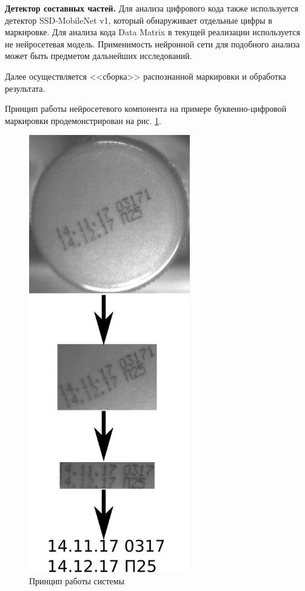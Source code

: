 \textbf{Детектор составных частей.} Для анализа цифрового кода также используется детектор SSD-MobileNet v1, который обнаруживает отдельные цифры в маркировке.
Для анализа кода Data Matrix в текущей реализации используется не нейросетевая модель. Применимость нейронной сети для подобного анализа может быть предметом дальнейших исследований.  

Далее осуществляется <<сборка>> распознанной маркировки и обработка результата.

Принцип работы нейросетевого компонента на примере буквенно-цифровой маркировки продемонстрирован на рис. \ref{fig:system_work}.

\begin{figure}[!ht]
	\centering
	\includegraphics[width=7cm]{man-source/images/ch4/pic4-5.png}
	\caption{Принцип работы системы}
	\label{fig:system_work}
\end{figure}

